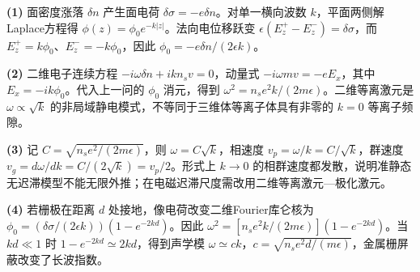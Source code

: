 \par\noindent\textbf{(1)} 面密度涨落 \(\delta n\) 产生面电荷 \(\delta\sigma=-e\delta n\)。对单一横向波数 \(k\)，平面两侧解Laplace方程得 \(\phi(z)=\phi_0e^{-k|z|}\)。法向电位移跃变 \(\epsilon(E_z^+-E_z^-)=\delta\sigma\)，而 \(E_z^+=k\phi_0\)、\(E_z^-=-k\phi_0\)，因此 \(\phi_0=-e\delta n/(2\epsilon k)\)。
\par\noindent\textbf{(2)} 二维电子连续方程 \(-i\omega\delta n+ikn_sv=0\)，动量式 \(-i\omega mv=-eE_x\)，其中 \(E_x=-ik\phi_0\)。代入上一问的 \(\phi_0\) 消元，得到 \(\omega^2=n_se^2k/(2m\epsilon)\)。二维等离激元是 \(\omega\propto\sqrt k\) 的非局域静电模式，不等同于三维体等离子体具有非零的 \(k=0\) 等离子频隙。
\par\noindent\textbf{(3)} 记 \(C=\sqrt{n_se^2/(2m\epsilon)}\)，则 \(\omega=C\sqrt k\)，相速度 \(v_p=\omega/k=C/\sqrt k\)，群速度 \(v_g=d\omega/dk=C/(2\sqrt k)=v_p/2\)。形式上 \(k\to0\) 的相群速度都发散，说明准静态无迟滞模型不能无限外推；在电磁迟滞尺度需改用二维等离激元—极化激元。
\par\noindent\textbf{(4)} 若栅极在距离 \(d\) 处接地，像电荷改变二维Fourier库仑核为 \(\phi_0=(\delta\sigma/(2\epsilon k))(1-e^{-2kd})\)。因此 \(\omega^2=[n_se^2k/(2m\epsilon)](1-e^{-2kd})\)。当 \(kd\ll1\) 时 \(1-e^{-2kd}\simeq2kd\)，得到声学模 \(\omega\simeq ck\)，\(c=\sqrt{n_se^2d/(m\epsilon)}\)，金属栅屏蔽改变了长波指数。
